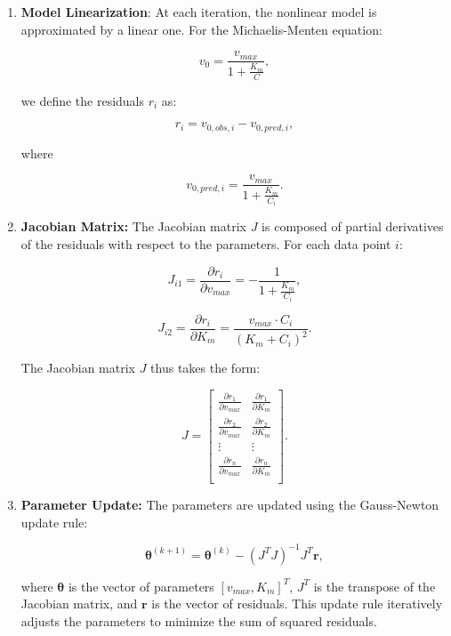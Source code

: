 \documentclass{article} %
\theoremstyle{definition}
\theoremstyle{remark}
\theoremstyle{plain}
\begin{document}
\begin{enumerate}
    \item \textbf{Model Linearization}:
    At each iteration, the nonlinear model is approximated by a linear one. For the Michaelis-Menten equation:

    \[
    v_0 = \frac{v_{max}}{1 + \frac{K_m}{C}},
    \]
    
    we define the residuals \(r_i\) as:
    
    \[
    r_i = v_{0,obs,i} - v_{0,pred,i},
    \]
    
    where 
    
    \[
    v_{0,pred,i} = \frac{v_{max}}{1 + \frac{K_m}{C_i}}.
    \]
    \item \textbf{Jacobian Matrix:}
       The Jacobian matrix \(J\) is composed of partial derivatives of the residuals with respect to the parameters. For each data point \(i\):

       \[
       J_{i1} = \frac{\partial r_i}{\partial v_{max}} = -\frac{1}{1 + \frac{K_m}{C_i}},
       \]
    
       \[
       J_{i2} = \frac{\partial r_i}{\partial K_m} = \frac{v_{max} \cdot C_i}{(K_m + C_i)^2}.
       \]
    
       The Jacobian matrix \(J\) thus takes the form:
    
       \[
       J = \begin{bmatrix}
       \frac{\partial r_1}{\partial v_{max}} & \frac{\partial r_1}{\partial K_m} \\
       \frac{\partial r_2}{\partial v_{max}} & \frac{\partial r_2}{\partial K_m} \\
       \vdots & \vdots \\
       \frac{\partial r_n}{\partial v_{max}} & \frac{\partial r_n}{\partial K_m} \\
       \end{bmatrix}.
       \]

    \item \textbf{Parameter Update:}
     The parameters are updated using the Gauss-Newton update rule:

       \[
       \mathbf{\theta}^{(k+1)} = \mathbf{\theta}^{(k)} - (J^T J)^{-1} J^T \mathbf{r},
       \]
    
       where \(\mathbf{\theta}\) is the vector of parameters \([v_{max}, K_m]^T\), \(J^T\) is the transpose of the Jacobian matrix, and \(\mathbf{r}\) is the vector of residuals. This update rule iteratively adjusts the parameters to minimize the sum of squared residuals.
\end{enumerate}
\end{document}

